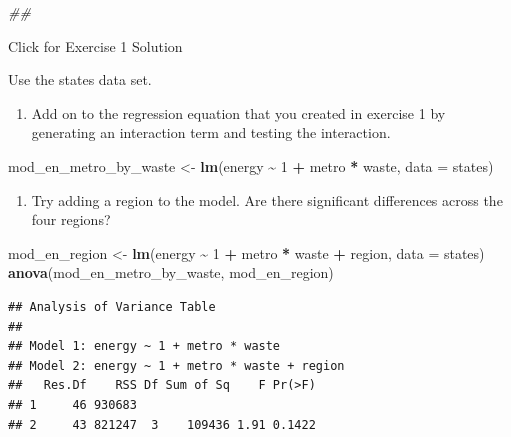 \documentclass[
]{book}
\newenvironment{Shaded}{\begin{snugshade}}{\end{snugshade}}
\newcommand{\CommentTok}[1]{\textcolor[rgb]{0.56,0.35,0.01}{\textit{#1}}}
\newcommand{\DataTypeTok}[1]{\textcolor[rgb]{0.13,0.29,0.53}{#1}}
\newcommand{\DecValTok}[1]{\textcolor[rgb]{0.00,0.00,0.81}{#1}}
\newcommand{\KeywordTok}[1]{\textcolor[rgb]{0.13,0.29,0.53}{\textbf{#1}}}
\newcommand{\NormalTok}[1]{#1}
\newcommand{\OperatorTok}[1]{\textcolor[rgb]{0.81,0.36,0.00}{\textbf{#1}}}
\newcommand{\StringTok}[1]{\textcolor[rgb]{0.31,0.60,0.02}{#1}}
\providecommand{\tightlist}{%
  \setlength{\itemsep}{0pt}\setlength{\parskip}{0pt}}
\begin{document}
\begin{Shaded}
\begin{Highlighting}[]
\CommentTok{\#\# }
\end{Highlighting}
\end{Shaded}

{Click for Exercise 1 Solution}

\begin{alert}

Use the states data set.

\begin{enumerate}
\def\labelenumi{\arabic{enumi}.}
\tightlist
\item
  Add on to the regression equation that you created in exercise 1 by generating an interaction term and testing the interaction.
\end{enumerate}

\begin{Shaded}
\begin{Highlighting}[]
\NormalTok{  mod\_en\_metro\_by\_waste \textless{}{-}}\StringTok{ }\KeywordTok{lm}\NormalTok{(energy }\OperatorTok{\textasciitilde{}}\StringTok{ }\DecValTok{1} \OperatorTok{+}\StringTok{ }\NormalTok{metro }\OperatorTok{*}\StringTok{ }\NormalTok{waste, }\DataTypeTok{data =}\NormalTok{ states)}
\end{Highlighting}
\end{Shaded}

\begin{enumerate}
\def\labelenumi{\arabic{enumi}.}
\setcounter{enumi}{1}
\tightlist
\item
  Try adding a region to the model. Are there significant differences across the four regions?
\end{enumerate}

\begin{Shaded}
\begin{Highlighting}[]
\NormalTok{  mod\_en\_region \textless{}{-}}\StringTok{ }\KeywordTok{lm}\NormalTok{(energy }\OperatorTok{\textasciitilde{}}\StringTok{ }\DecValTok{1} \OperatorTok{+}\StringTok{ }\NormalTok{metro }\OperatorTok{*}\StringTok{ }\NormalTok{waste }\OperatorTok{+}\StringTok{ }\NormalTok{region, }\DataTypeTok{data =}\NormalTok{ states)}
  \KeywordTok{anova}\NormalTok{(mod\_en\_metro\_by\_waste, mod\_en\_region)}
\end{Highlighting}
\end{Shaded}

\begin{verbatim}
## Analysis of Variance Table
## 
## Model 1: energy ~ 1 + metro * waste
## Model 2: energy ~ 1 + metro * waste + region
##   Res.Df    RSS Df Sum of Sq    F Pr(>F)
## 1     46 930683                         
## 2     43 821247  3    109436 1.91 0.1422
\end{verbatim}

\end{alert}
\end{document}
